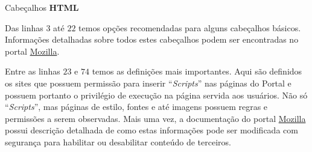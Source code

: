 \begin{code}
    \inputminted[label=headers.js]{JavaScript}{../RS0003/anexos/headers.js}
    \caption{Cabeçalhos \textbf{HTML}}\label{RS0003:code:headers}
\end{code}

Das linhas $3$ até $22$ temos opções recomendadas para alguns cabeçalhos básicos. Informações detalhadas sobre todos estes cabeçalhos podem ser encontradas no portal \href{https://developer.mozilla.org/en-US/docs/Web/HTTP/Headers}{Mozilla}.

Entre as linhas $23$ e $74$ temos as definições mais importantes. Aqui são definidos os sites que possuem permissão para inserir ``\textit{Scripts}'' nas páginas do Portal e possuem portanto o privilégio de execução na página servida aos usuários. Não só ``\textit{Scripts}'', mas páginas de estilo, fontes e até imagens possuem regras e permissões a serem observadas. Mais uma vez, a documentação do portal \href{https://developer.mozilla.org/en-US/docs/Web/HTTP/Headers}{Mozilla} possui descrição detalhada de como estas informações pode ser modificada com segurança para habilitar ou desabilitar conteúdo de terceiros.